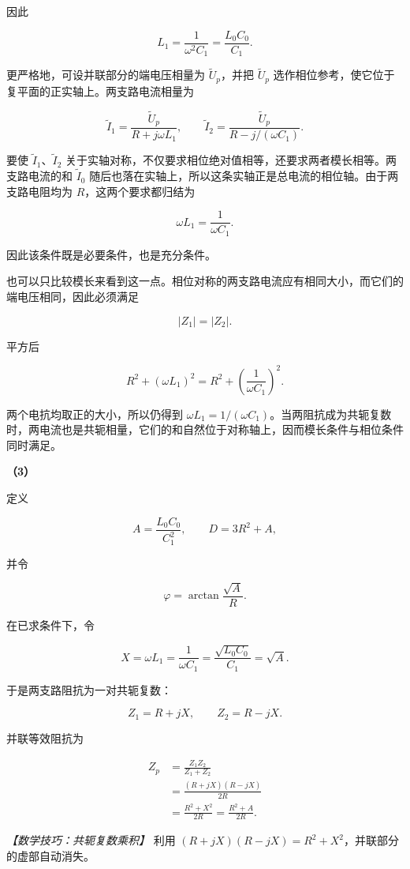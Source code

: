 \documentclass[12pt,a4paper,UTF8]{ctexart}
\begin{document}
因此

\[\boxed{L_1=\frac1{\omega^2C_1}=\frac{L_0C_0}{C_1}}.\]

更严格地，可设并联部分的端电压相量为 \(\widetilde U_p\)，并把
\(\widetilde U_p\)
选作相位参考，使它位于复平面的正实轴上。两支路电流相量为

\[\widetilde I_1=\frac{\widetilde U_p}{R+j\omega L_1},\qquad
\widetilde I_2=\frac{\widetilde U_p}{R-j/(\omega C_1)}.\]

要使 \(\widetilde I_1\)、\(\widetilde I_2\)
关于实轴对称，不仅要求相位绝对值相等，还要求两者模长相等。两支路电流的和
\(\widetilde I_0\)
随后也落在实轴上，所以这条实轴正是总电流的相位轴。由于两支路电阻均为
\(R\)，这两个要求都归结为

\[\omega L_1=\frac1{\omega C_1}.\]

因此该条件既是必要条件，也是充分条件。

也可以只比较模长来看到这一点。相位对称的两支路电流应有相同大小，而它们的端电压相同，因此必须满足

\[|Z_1|=|Z_2|.\]

平方后

\[R^2+(\omega L_1)^2
=R^2+\left(\frac1{\omega C_1}\right)^2.\]

两个电抗均取正的大小，所以仍得到
\(\omega L_1=1/(\omega C_1)\)。当两阻抗成为共轭复数时，两电流也是共轭相量，它们的和自然位于对称轴上，因而模长条件与相位条件同时满足。

\textbf{（3）}

定义

\[A=\frac{L_0C_0}{C_1^2},\qquad D=3R^2+A,\]

并令

\[\varphi=\arctan\frac{\sqrt A}{R}.\]

在已求条件下，令

\[X=\omega L_1=\frac1{\omega C_1}
=\frac{\sqrt{L_0C_0}}{C_1}=\sqrt A.\]

于是两支路阻抗为一对共轭复数：

\[Z_1=R+jX,\qquad Z_2=R-jX.\]

并联等效阻抗为

\[\begin{aligned}
Z_p&=\frac{Z_1Z_2}{Z_1+Z_2}\\
&=\frac{(R+jX)(R-jX)}{2R}\\
&=\frac{R^2+X^2}{2R}
=\frac{R^2+A}{2R}.
\end{aligned}\]

\emph{【数学技巧：共轭复数乘积】} 利用
\((R+jX)(R-jX)=R^2+X^2\)，并联部分的虚部自动消失。
\end{document}
